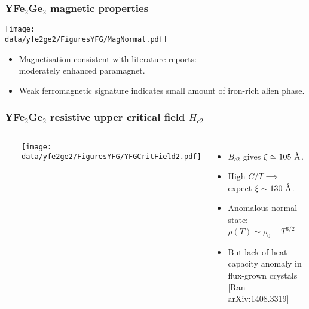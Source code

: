 \begin{frame}[label=YFGMagn]
\frametitle{YFe$_2$Ge$_2$ magnetic properties}

\centerline{\texttt{[image: \\data/yfe2ge2/FiguresYFG/MagNormal.pdf]}}
\begin{itemize}
\item
Magnetisation consistent with literature reports: \\ moderately enhanced paramagnet.
\item
Weak ferromagnetic signature indicates small amount of iron-rich alien phase.
\end{itemize}
\end{frame}





\begin{frame}[label=YFGCritField]
\frametitle{YFe$_2$Ge$_2$ resistive upper critical field $H_{c2}$}
\begin{columns}[t]
\centerline{~}
\centerline{\texttt{[image: \\data/yfe2ge2/FiguresYFG/YFGCritField2.pdf]}}

\begin{itemize}
\item \itemsep 20pt
$B_{c2}$ gives $\xi \simeq 105 ~\mbox{\AA}$.

\item
High $C/T \implies$ expect $\xi \sim 130 ~\mbox{\AA}$.

\item
Anomalous normal state: \\$\rho(T) \sim \rho_0 + T^{3/2}$

\item<2->
\vspace{0.2em}
But lack of heat capacity anomaly in flux-grown 
  crystals  
{\small [Ran arXiv:1408.3319]}
\end{itemize}
\end{columns} 
\end{frame}



